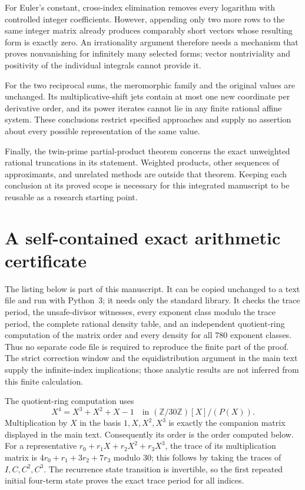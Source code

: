 \documentclass[11pt,a4paper]{article}
\theoremstyle{definition}\newtheorem{definition}[theorem]{Definition}
\theoremstyle{remark}\newtheorem{remark}[theorem]{Remark}
\begin{document}
For Euler's constant, cross-index elimination removes every logarithm
with controlled integer coefficients. However, appending only two more
rows to the same integer matrix already produces comparably short
vectors whose resulting form is exactly zero. An irrationality
argument therefore needs a mechanism that proves nonvanishing for
infinitely many selected forms; vector nontriviality and positivity of
the individual integrals cannot provide it.

For the two reciprocal sums, the meromorphic family and the original
values are unchanged. Its multiplicative-shift jets contain at most
one new coordinate per derivative order, and its power iterates cannot
lie in any finite rational affine system. These conclusions restrict
specified approaches and supply no assertion about every possible
representation of the same value.

Finally, the twin-prime partial-product theorem concerns the exact
unweighted rational truncations in its statement. Weighted products,
other sequences of approximants, and unrelated methods are outside
that theorem. Keeping each conclusion at its proved scope is necessary
for this integrated manuscript to be reusable as a research starting
point.
\clearpage\appendix
\section{A self-contained exact arithmetic certificate}
\label{app:certificate}

The listing below is part of this manuscript.  It can be copied unchanged
to a text file and run with Python~3; it needs only the standard library.
It checks the trace period, the unsafe-divisor witnesses, every exponent
class modulo the trace period, the complete rational density table, and
an independent quotient-ring computation of the matrix order and every
density for all $780$ exponent classes.  Thus no
separate code file is required to reproduce the finite part of the proof.
The strict correction window and the equidistribution argument in the
main text supply the infinite-index implications; those analytic results
are not inferred from this finite calculation.

The quotient-ring computation uses
\[
 X^4=X^3+X^2+X-1
 \quad\text{in }(\mathbb Z/30\mathbb Z)[X]/(P(X)).
\]
Multiplication by $X$ in the basis $1,X,X^2,X^3$ is exactly the companion
matrix displayed in the main text.  Consequently its order is the order
computed below.  For a representative $r_0+r_1X+r_2X^2+r_3X^3$,
the trace of its multiplication matrix is
$4r_0+r_1+3r_2+7r_3$ modulo $30$; this follows by taking the traces of
$I,C,C^2,C^3$.  The recurrence state transition is invertible, so the
first repeated initial four-term state proves the exact trace period for
all indices.
\end{document}
